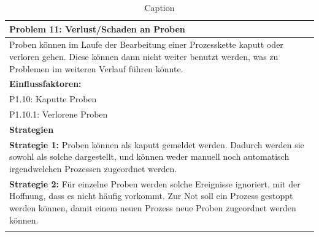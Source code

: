\documentclass[enabledeprecatedfontcommands,fontsize=12pt,paper=a4,twoside]{scrartcl}
\begin{document}
\begin{table}[H]
    \centering
    \begin{tabular}{|p{15cm}|}
    \hline
          \textbf{Problem 11:} Verlust/Schaden an Proben
          \\ \hline
          Proben können im Laufe der Bearbeitung einer Prozesskette kaputt oder verloren gehen. Diese können dann nicht weiter benutzt werden, was zu Problemen im weiteren Verlauf führen könnte.
          \\ \hline
          \textbf{Einflussfaktoren: } \\
          P1.10: Kaputte Proben\\
          P1.10.1: Verlorene Proben \\
          \hline
          \textbf{Strategien} \\ \hline
          \textbf{Strategie 1:} Proben können als kaputt gemeldet werden. Dadurch werden sie sowohl als solche dargestellt, und können weder manuell noch automatisch irgendwelchen Prozessen zugeordnet werden. \\
          \textbf{Strategie 2:} Für einzelne Proben werden solche Ereignisse ignoriert, mit der Hoffnung, dass es nicht häufig vorkommt. Zur Not soll ein Prozess gestoppt werden können, damit einem neuen Prozess neue Proben zugeordnet werden können. \\
          \\ \hline
    \end{tabular}
    \caption{Caption}
    \label{tab:my_label}
\end{table}
\end{document}
